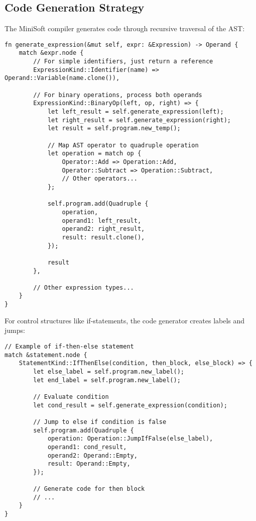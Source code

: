 \documentclass[12pt,a4paper]{article}
\begin{document}
\subsection{Code Generation Strategy}
The MiniSoft compiler generates code through recursive traversal of the AST:

\begin{lstlisting}[caption={Expression Code Generation}]
fn generate_expression(&mut self, expr: &Expression) -> Operand {
    match &expr.node {
        // For simple identifiers, just return a reference
        ExpressionKind::Identifier(name) => Operand::Variable(name.clone()),
        
        // For binary operations, process both operands
        ExpressionKind::BinaryOp(left, op, right) => {
            let left_result = self.generate_expression(left);
            let right_result = self.generate_expression(right);
            let result = self.program.new_temp();

            // Map AST operator to quadruple operation
            let operation = match op {
                Operator::Add => Operation::Add,
                Operator::Subtract => Operation::Subtract,
                // Other operators...
            };

            self.program.add(Quadruple {
                operation,
                operand1: left_result,
                operand2: right_result,
                result: result.clone(),
            });

            result
        },
        
        // Other expression types...
    }
}
\end{lstlisting}

For control structures like if-statements, the code generator creates labels and jumps:

\begin{lstlisting}[caption={If-Statement Code Generation}]
// Example of if-then-else statement
match &statement.node {
    StatementKind::IfThenElse(condition, then_block, else_block) => {
        let else_label = self.program.new_label();
        let end_label = self.program.new_label();
        
        // Evaluate condition
        let cond_result = self.generate_expression(condition);
        
        // Jump to else if condition is false
        self.program.add(Quadruple {
            operation: Operation::JumpIfFalse(else_label),
            operand1: cond_result,
            operand2: Operand::Empty,
            result: Operand::Empty,
        });
        
        // Generate code for then block
        // ...
    }
}
\end{lstlisting}
\end{document}
